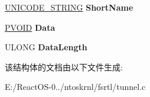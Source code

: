 \begin{DoxyCompactItemize}
\mbox{\label{struct_t_u_n_n_e_l___n_o_d_e___e_n_t_r_y_ae41236519d78aa84a2f9f8fedb3942a2}} 
\hyperlink{struct___u_n_i_c_o_d_e___s_t_r_i_n_g}{U\+N\+I\+C\+O\+D\+E\+\_\+\+S\+T\+R\+I\+NG} {\bfseries Short\+Name}
\item 
\mbox{\label{struct_t_u_n_n_e_l___n_o_d_e___e_n_t_r_y_af4e4b6a1948c3af5479d6ae0d564e508}} 
\hyperlink{interfacevoid}{P\+V\+O\+ID} {\bfseries Data}
\item 
\mbox{\label{struct_t_u_n_n_e_l___n_o_d_e___e_n_t_r_y_a5fd96f8d6f3c0b06d9dd9c20ac818f8f}} 
U\+L\+O\+NG {\bfseries Data\+Length}
\end{DoxyCompactItemize}


该结构体的文档由以下文件生成\+:\begin{DoxyCompactItemize}
\item 
E\+:/\+React\+O\+S-\/0../ntoskrnl/fsrtl/tunnel.\+c\end{DoxyCompactItemize}
